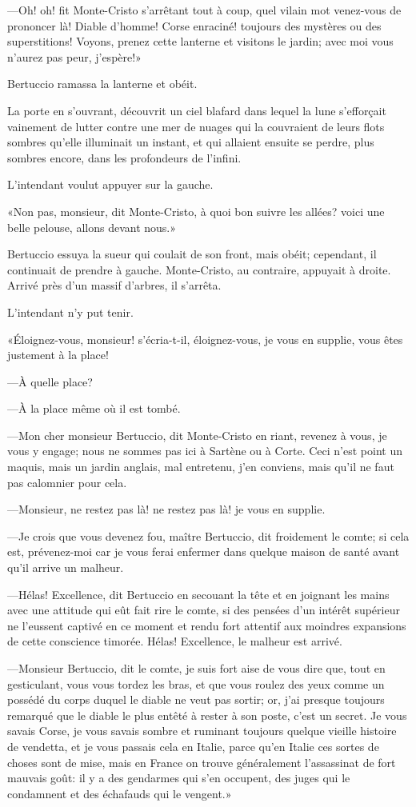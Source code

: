 —Oh! oh! fit Monte-Cristo s'arrêtant tout à coup, quel vilain mot venez-vous de prononcer là! Diable d'homme! Corse enraciné! toujours des mystères ou des superstitions! Voyons, prenez cette lanterne et visitons le jardin; avec moi vous n'aurez pas peur, j'espère!» 

Bertuccio ramassa la lanterne et obéit. 

La porte en s'ouvrant, découvrit un ciel blafard dans lequel la lune s'efforçait vainement de lutter contre une mer de nuages qui la couvraient de leurs flots sombres qu'elle illuminait un instant, et qui allaient ensuite se perdre, plus sombres encore, dans les profondeurs de l'infini. 

L'intendant voulut appuyer sur la gauche. 

«Non pas, monsieur, dit Monte-Cristo, à quoi bon suivre les allées? voici une belle pelouse, allons devant nous.» 

Bertuccio essuya la sueur qui coulait de son front, mais obéit; cependant, il continuait de prendre à gauche. Monte-Cristo, au contraire, appuyait à droite. Arrivé près d'un massif d'arbres, il s'arrêta.  

L'intendant n'y put tenir. 

«Éloignez-vous, monsieur! s'écria-t-il, éloignez-vous, je vous en supplie, vous êtes justement à la place! 

—À quelle place? 

—À la place même où il est tombé. 

—Mon cher monsieur Bertuccio, dit Monte-Cristo en riant, revenez à vous, je vous y engage; nous ne sommes pas ici à Sartène ou à Corte. Ceci n'est point un maquis, mais un jardin anglais, mal entretenu, j'en conviens, mais qu'il ne faut pas calomnier pour cela.  

—Monsieur, ne restez pas là! ne restez pas là! je vous en supplie. 

—Je crois que vous devenez fou, maître Bertuccio, dit froidement le comte; si cela est, prévenez-moi car je vous ferai enfermer dans quelque maison de santé avant qu'il arrive un malheur. 

—Hélas! Excellence, dit Bertuccio en secouant la tête et en joignant les mains avec une attitude qui eût fait rire le comte, si des pensées d'un intérêt supérieur ne l'eussent captivé en ce moment et rendu fort attentif aux moindres expansions de cette conscience timorée. Hélas! Excellence, le malheur est arrivé. 

—Monsieur Bertuccio, dit le comte, je suis fort aise de vous dire que, tout en gesticulant, vous vous tordez les bras, et que vous roulez des yeux comme un possédé du corps duquel le diable ne veut pas sortir; or, j'ai presque toujours remarqué que le diable le plus entêté à rester à son poste, c'est un secret. Je vous savais Corse, je vous savais sombre et ruminant toujours quelque vieille histoire de vendetta, et je vous passais cela en Italie, parce qu'en Italie ces sortes de choses sont de mise, mais en France on trouve généralement l'assassinat de fort mauvais goût: il y a des gendarmes qui s'en occupent, des juges qui le condamnent et des échafauds qui le vengent.» 

